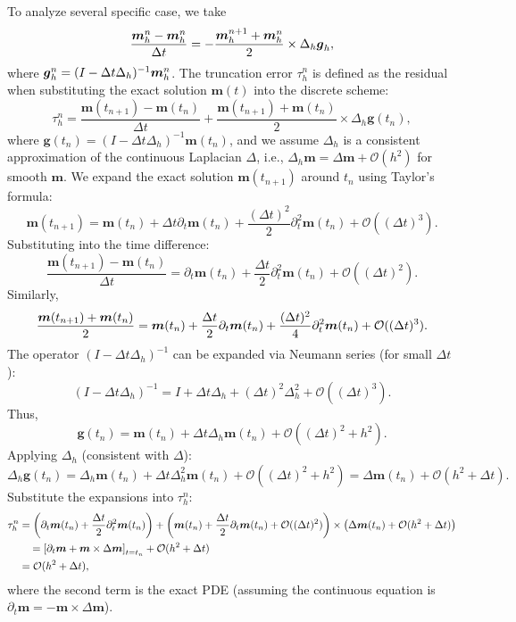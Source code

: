 \documentclass[preprint,times,3p]{elsarticle}
\def\g{\mbox{\boldmath $g$}}
\def\m{\mbox{\boldmath $m$}}
\begin{document}
To analyze several specific case, we take
\begin{align*}
    \frac{\m_h^n-\m_h^n}{\Delta t}=-\frac{\m_h^{n+1}+\m_h^n}{2}\times \Delta_h \g_h,
\end{align*}
where $\g_h^n=(I-\Delta t \Delta_h)^{-1}\m_h^n$. The truncation error \(\tau_h^n\) is defined as the residual when substituting the exact solution \(\boldsymbol{m}(t)\) into the discrete scheme:
\[
\tau_h^n = \frac{\boldsymbol{m}(t_{n+1}) - \boldsymbol{m}(t_n)}{\Delta t} + \frac{\boldsymbol{m}(t_{n+1}) + \boldsymbol{m}(t_n)}{2} \times \Delta_h \boldsymbol{g}(t_n),
\]
where \(\boldsymbol{g}(t_n) = (I - \Delta t \Delta_h)^{-1} \boldsymbol{m}(t_n)\), and we assume \(\Delta_h\) is a consistent approximation of the continuous Laplacian \(\Delta\), i.e., \(\Delta_h \boldsymbol{m} = \Delta \boldsymbol{m} + \mathcal{O}(h^2)\) for smooth \(\boldsymbol{m}\).
We expand the exact solution \(\boldsymbol{m}(t_{n+1})\) around \(t_n\) using Taylor's formula:
\[
\boldsymbol{m}(t_{n+1}) = \boldsymbol{m}(t_n) + \Delta t \partial_t \boldsymbol{m}(t_n) + \frac{(\Delta t)^2}{2} \partial_t^2 \boldsymbol{m}(t_n) + \mathcal{O}((\Delta t)^3).
\]
Substituting into the time difference:
\[
\frac{\boldsymbol{m}(t_{n+1}) - \boldsymbol{m}(t_n)}{\Delta t} = \partial_t \boldsymbol{m}(t_n) + \frac{\Delta t}{2} \partial_t^2 \boldsymbol{m}(t_n) + \mathcal{O}((\Delta t)^2).
\]
Similarly,
\[
\frac{\boldsymbol{m}(t_{n+1}) + \boldsymbol{m}(t_n)}{2} = \m(t_n)+\frac{\Delta t}{2} \partial_t \boldsymbol{m}(t_n) + \frac{(\Delta t)^2}{4} \partial_t^2 \boldsymbol{m}(t_n) + \mathcal{O}((\Delta t)^3).
\]
The operator \((I - \Delta t \Delta_h)^{-1}\) can be expanded via Neumann series (for small \(\Delta t\)):
\[
(I - \Delta t \Delta_h)^{-1} = I + \Delta t \Delta_h + (\Delta t)^2 \Delta_h^2 + \mathcal{O}((\Delta t)^3).
\]
Thus,
\[
\boldsymbol{g}(t_n) = \boldsymbol{m}(t_n) + \Delta t \Delta_h \boldsymbol{m}(t_n) + \mathcal{O}((\Delta t)^2+h^2).
\]
Applying \(\Delta_h\) (consistent with \(\Delta\)):
\[
\Delta_h \boldsymbol{g}(t_n) = \Delta_h \boldsymbol{m}(t_n) + \Delta t \Delta_h^2 \boldsymbol{m}(t_n) + \mathcal{O}((\Delta t)^2+h^2) = \Delta \boldsymbol{m}(t_n) + \mathcal{O}(h^2 + \Delta t).
\]
Substitute the expansions into \(\tau_h^n\):
\[
\begin{aligned}
\tau_h^n &= \left( \partial_t \boldsymbol{m}(t_n) + \frac{\Delta t}{2} \partial_t^2 \boldsymbol{m}(t_n) \right) + \left( \m(t_n)+\frac{\Delta t}{2} \partial_t \boldsymbol{m}(t_n) + \mathcal{O}((\Delta t)^2) \right) \times \left( \Delta \boldsymbol{m}(t_n) + \mathcal{O}(h^2 + \Delta t) \right) \\
&\quad = \left[ \partial_t \boldsymbol{m} + \boldsymbol{m} \times \Delta \boldsymbol{m} \right]_{t=t_n}+\mathcal{O}( h^2+\Delta t) \\
&= \mathcal{O}( h^2+\Delta t),
\end{aligned}
\]
where the second term is the exact PDE (assuming the continuous equation is \(\partial_t \boldsymbol{m} = -\boldsymbol{m} \times \Delta \boldsymbol{m}\)).
\end{document}
